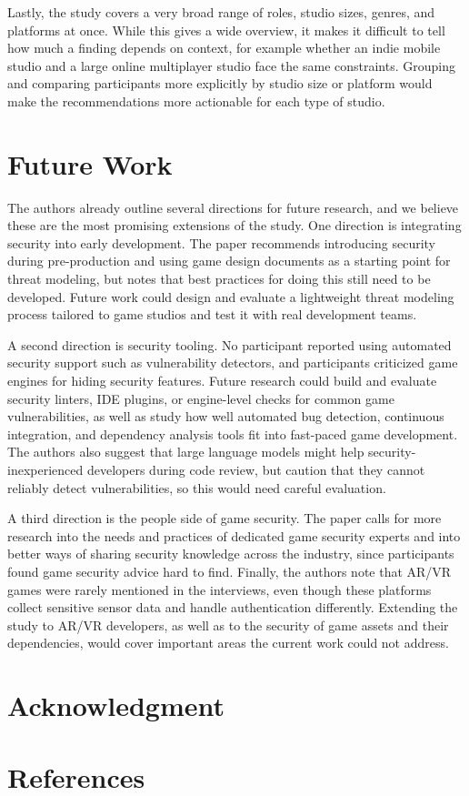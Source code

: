\documentclass[conference]{IEEEtran}
\begin{document}
Lastly, the study covers a very broad range of roles, studio sizes, genres, and platforms at once. While this gives a wide overview, it makes it difficult to tell how much a finding depends on context, for example whether an indie mobile studio and a large online multiplayer studio face the same constraints. Grouping and comparing participants more explicitly by studio size or platform would make the recommendations more actionable for each type of studio.

\section{Future Work}
The authors already outline several directions for future research, and we believe these are the most promising extensions of the study. One direction is integrating security into early development. The paper recommends introducing security during pre-production and using game design documents as a starting point for threat modeling, but notes that best practices for doing this still need to be developed. Future work could design and evaluate a lightweight threat modeling process tailored to game studios and test it with real development teams.

A second direction is security tooling. No participant reported using automated security support such as vulnerability detectors, and participants criticized game engines for hiding security features. Future research could build and evaluate security linters, IDE plugins, or engine-level checks for common game vulnerabilities, as well as study how well automated bug detection, continuous integration, and dependency analysis tools fit into fast-paced game development. The authors also suggest that large language models might help security-inexperienced developers during code review, but caution that they cannot reliably detect vulnerabilities, so this would need careful evaluation.

A third direction is the people side of game security. The paper calls for more research into the needs and practices of dedicated game security experts and into better ways of sharing security knowledge across the industry, since participants found game security advice hard to find. Finally, the authors note that AR/VR games were rarely mentioned in the interviews, even though these platforms collect sensitive sensor data and handle authentication differently. Extending the study to AR/VR developers, as well as to the security of game assets and their dependencies, would cover important areas the current work could not address.

\section*{Acknowledgment}


\section*{References}
\end{document}

